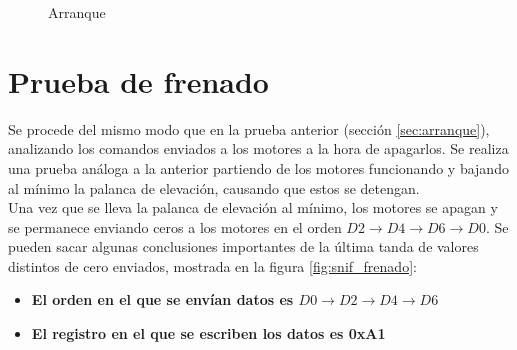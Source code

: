 \documentclass[main]{subfiles}
\begin{document}
\begin{figure} [h!]
\centering
  \caption{Arranque}
  \label{fig:arranque}
\end{figure}


\section{Prueba de frenado}
\label{sec:frenado}
Se procede del mismo modo que en la prueba anterior (sección \ref{sec:arranque}), analizando los comandos enviados a los motores a la hora de apagarlos. Se realiza una prueba análoga a la anterior partiendo de los motores funcionando y bajando al mínimo la palanca de elevación, causando que estos se detengan.\\

Una vez que se lleva la palanca de elevación al mínimo, los motores se apagan y se permanece enviando ceros a los motores en el orden $D2\rightarrow D4\rightarrow D6\rightarrow D0$. Se pueden sacar algunas conclusiones importantes de la última tanda de valores distintos de cero enviados, mostrada en la figura \ref{fig:snif_frenado}:
\begin{itemize}
\item \textbf{El orden en el que se envían datos es $D0\rightarrow D2\rightarrow D4\rightarrow D6$}
\item \textbf{El registro en el que se escriben los datos es 0xA1}
\end{itemize}
\end{document}
